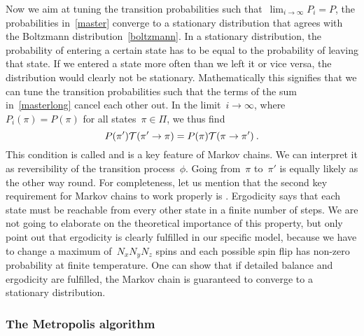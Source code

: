 Now we aim at tuning the transition probabilities such that~$\lim_{i \to \infty}
P_i = P$, \ie{} the probabilities in~\eqref{master} converge to a stationary
distribution that agrees with the Boltzmann distribution~\eqref{boltzmann}. In a
stationary distribution, the probability of entering a certain state has to be
equal to the probability of leaving that state. If we entered a state more often
than we left it or vice versa, the distribution would clearly not be stationary.
Mathematically this signifies that we can tune the transition probabilities such
that the terms of the sum in~\eqref{masterlong} cancel each other out. In the
limit~$i \to \infty$, where~$P_i(\pi) = P(\pi)$ for all states~$\pi \in \Pi$, we
thus find
%
\begin{equation}\label{detbal}
  P(\pi') \mathcal{T}(\pi' \to \pi) = P(\pi) \mathcal{T}(\pi \to \pi')\:.
\end{equation}
%
This condition is called  and is a key feature of
Markov chains. We can interpret it as reversibility of the transition
process~$\phi$. Going from~$\pi$ to~$\pi'$ is equally likely as the other way
round. For completeness, let us mention that the second key requirement for
Markov chains to work properly is .  Ergodicity says that
each state must be reachable from every other state in a finite number of steps.
We are not going to elaborate on the theoretical importance of this property,
but only point out that ergodicity is clearly fulfilled in our specific model,
because we have to change a maximum of~$N_x N_y N_z$ spins and each possible
spin flip has non-zero probability at finite temperature. One can show that if
detailed balance and ergodicity are fulfilled, the Markov chain is guaranteed to
converge to a stationary distribution.

\subsubsection{The Metropolis algorithm}

